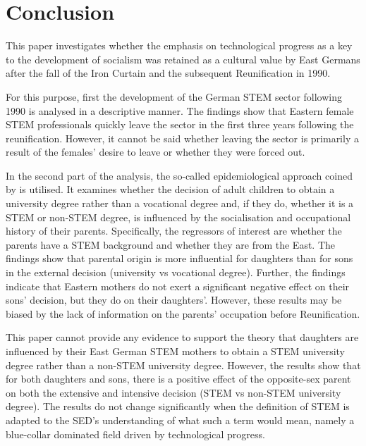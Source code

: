 \documentclass[a4paper, oneside, hyperfootnotes = false]{article}
\begin{document}
{\clearpage

\section{Conclusion}
\label{conclusion}

This paper investigates whether the emphasis on technological progress as a key to the development of socialism was retained as a cultural value by East Germans after the fall of the Iron Curtain and the subsequent Reunification in 1990.

For this purpose, first the development of the German STEM sector following 1990 is analysed in a descriptive manner.
The findings show that Eastern female STEM professionals quickly leave the sector in the first three years following the reunification.
However, it cannot be said whether leaving the sector is primarily a result of the females' desire to leave or whether they were forced out.

In the second part of the analysis, the so-called epidemiological approach coined by \cite{Fernandez2011} is utilised.
It examines whether the decision of adult children to obtain a university degree rather than a vocational degree and, if they do, whether it is a STEM or non-STEM degree, is influenced by the socialisation and occupational history of their parents.
Specifically, the regressors of interest are whether the parents have a STEM background and whether they are from the East.
The findings show that parental origin is more influential for daughters than for sons in the external decision (university vs vocational degree).
Further, the findings indicate that Eastern mothers do not exert a significant negative effect on their sons' decision, but they do on their daughters'.
However, these results may be biased by the lack of information on the parents' occupation before Reunification.

This paper cannot provide any evidence to support the theory that daughters are influenced by their East German STEM mothers to obtain a STEM university degree rather than a non-STEM university degree.
However, the results show that for both daughters and sons, there is a positive effect of the opposite-sex parent on both the extensive and intensive decision (STEM vs non-STEM university degree).
The results do not change significantly when the definition of STEM is adapted to the SED's understanding of what such a term would mean, namely a blue-collar dominated field driven by technological progress.

\vspace{8cm}

{}

\makeatletter %


\label{references}

\makeatother

\vspace{-.3cm}

\clearpage

}%
\end{document}
